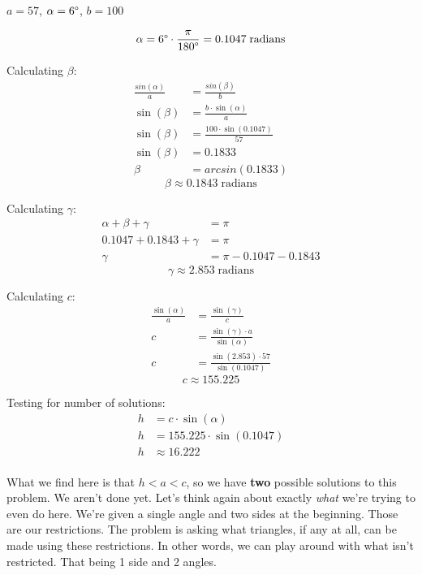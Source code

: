 \begin{problem}[13.]
    $a = 57$, $\alpha = 6\degree$, $b = 100$
\end{problem}

\begin{solution}
   \[\alpha = 6\degree \cdot \frac{\pi}{180\degree} = 0.1047 \; \text{radians}\] 
   
   Calculating $\beta$:
   \begin{align}
       \frac{sin(\alpha)}{a} &= \frac{sin(\beta)}{b} \\
       \sin(\beta) &= \frac{b \cdot \sin(\alpha)}{a} \\
       \sin(\beta) &= \frac{100 \cdot \sin(0.1047)}{57} \\
       \sin(\beta) &= 0.1833 \\
       \beta &= arcsin(0.1833)
   \end{align}
   \[\boxed{ \beta \approx 0.1843 \; \text{radians}  }\]
    
   Calculating $\gamma$:
    \begin{align}
        \alpha + \beta + \gamma &= \pi \\
        0.1047 + 0.1843 + \gamma &= \pi \\
        \gamma &= \pi - 0.1047 - 0.1843
    \end{align}
    \[\boxed{  \gamma \approx 2.853 \; \text{radians}  }\]
    
    Calculating $c$:
    \begin{align}
        \frac{\sin(\alpha)}{a} &= \frac{\sin(\gamma)}{c} \\
        c &= \frac{\sin(\gamma) \cdot a}{\sin(\alpha)} \\
        c &= \frac{\sin(2.853) \cdot 57}{\sin(0.1047)}
    \end{align}
    \[\boxed{ c \approx 155.225  }\]
    
    Testing for number of solutions: 
    \begin{align}
        h &= c \cdot \sin(\alpha) \\
        h &= 155.225 \cdot \sin(0.1047) \\
        h &\approx 16.222 \\
    \end{align}
    
    What we find here is that $h < a < c$, so we have \textbf{two} possible solutions to this problem. We aren't done yet. Let's think again about exactly \emph{what} we're trying to even do here. We're given a single angle and two sides at the beginning. Those are our restrictions. The problem is asking what triangles, if any at all, can be made using these restrictions. In other words, we can play around with what isn't restricted. That being 1 side and 2 angles. 
    

\end{solution}
